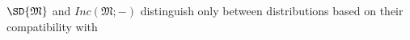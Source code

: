 \documentclass{article}
\theoremstyle{plain}
\theoremstyle{definition}
\theoremstyle{remark}
\newcommand{\dg}[1]{\mathfrak{#1}}
\newcommand\inco{\mathit{Inc}}
\numberwithin{equation}{section}
\begin{document}
$\SD{\dg M}$ and $\inco(\dg M;-)$ distinguish only
        between distributions based on their compatibility with
% 
\end{document}
